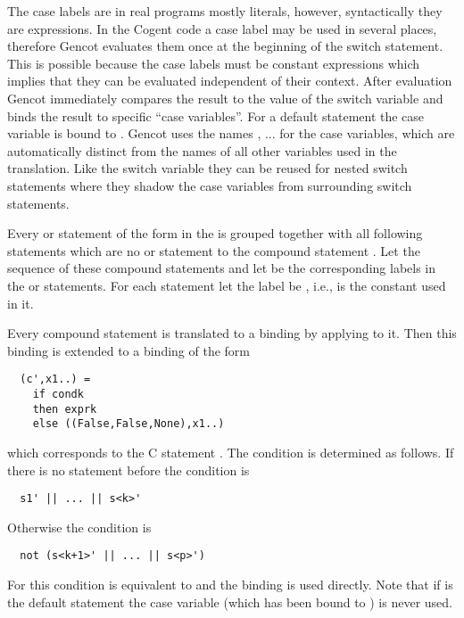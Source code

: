 The case labels are in real programs mostly literals, however, syntactically they are 
expressions. In the Cogent code a case label may be used in several places, therefore Gencot evaluates them once at the beginning 
of the switch statement. This is possible because the case labels must be constant 
expressions which implies that they can be evaluated independent of their context. After evaluation Gencot immediately compares the result
to the value of the switch variable and binds the result to specific ``case variables''. For a default statement the case variable is
bound to . Gencot uses the names , ... for the 
case variables, which are automatically distinct from the names of all other variables used in the translation. Like the switch variable
they can be reused for nested switch statements where they shadow the case variables from surrounding switch statements.

Every  or  statement  of the form  in the  is grouped together with all 
following statements  which are no  or  statement to the compound statement .
Let  the sequence of these compound statements and let  be the corresponding labels in the 
or  statements. For each  statement let the label  be , i.e.,  is the constant
used in it.

Every compound statement  is translated to a binding  by applying  to it. 
Then this binding is extended to a binding  of the form
\begin{verbatim}
  (c',x1..) = 
    if condk
    then exprk
    else ((False,False,None),x1..)
\end{verbatim}
which corresponds to the C statement . The condition  is determined as follows.
If there is no  statement before  the condition is
\begin{verbatim}
  s1' || ... || s<k>'
\end{verbatim}
Otherwise the condition is
\begin{verbatim}
  not (s<k+1>' || ... || s<p>')
\end{verbatim}
For  this condition is equivalent to  and the binding  is used directly. Note that if
 is the default statement the case variable  (which has been bound to ) is never used.

